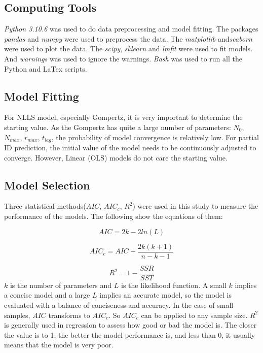 \documentclass[11pt]{article}
\begin{document}
\subsection{Computing Tools}   
\emph{Python 3.10.6} was used to do data preprocessing and model fitting. The packages \emph{pandas} and \emph{numpy} were used to preprocess the data. The \emph{matplotlib} and\emph{seaborn} were used to plot the data. The \emph{scipy}, \emph{sklearn} and \emph{lmfit} were used to fit models. And \emph{warnings} was used to ignore the warnings.
\emph{Bash} was used to run all the Python and LaTex scripts.

\subsection{Model Fitting} 
  For NLLS model, especially Gompertz, it is very important to determine the starting value. As the Gompertz has quite a large number of parameters: $N_0$, $N_{max}$, $r_{max}$, $t_{lag}$, the probability of model convergence is relatively low. For partial ID prediction, the initial value of the model needs to be continuously adjusted to converge. However, Linear (OLS) models do not care the starting value.
    
\subsection{Model Selection}
  Three statistical methods($AIC$, $AIC_c$, $R^2$) were used in this study to measure the performance of the models. The following show the equations of them:
  
  \begin{equation} 
  AIC = 2k - 2ln(L)
  \end{equation} 

  \begin{equation} 
  AIC_c = AIC + \frac{2k(k+1)}{n-k-1}
  \end{equation} 

  \begin{equation} 
  R^2 = 1 - \frac{SSR}{SST}
  \end{equation} 
  $k$ is the number of parameters and $L$ is the likelihood function. A small $k$ implies a concise model and a large $L$ implies an accurate model, so the model is evaluated with a balance of conciseness and accuracy.
  In the case of small samples, $AIC$ transforms to $AIC_c$. So $AIC_c$ can be applied to any sample size.
  $R^2$ is generally used in regression to assess how good or bad the model is. The closer the value is to 1, the better the model performance is, and less than 0, it usually means that the model is very poor.
  
\end{document}
